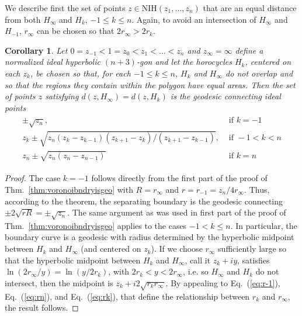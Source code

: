 \documentclass[10pt,a4paper]{article}
\newtheorem{corollary}{Corollary}
\begin{document}
 We describe first the set of points $z \in \text{NIH}(z_1, \ldots, z_n)$ that are an equal distance from both $H_{\infty}$ and $H_{k}$, $-1 \leq k \leq n$. Again, to avoid an intersection of $H_{\infty}$ and $H_{-1}$, $r_{\infty}$ can be chosen so that $2 r_{\infty} > 2 r_{k}$.  

 \begin{corollary}
 Let $0 = z_{-1} < 1 = z_0 < z_1 < \ldots < z_n$ and $z_{\infty} = \infty$ define a normalized ideal hyperbolic $(n+3)$-gon and let the horocycles $H_k$, centered on each $z_k$, be chosen so that, for each $-1 \leq k \leq n$, $H_k$ and $H_{\infty}$ do not overlap and so that the regions they contain within the polygon have equal areas. Then the set of points $z$ satisfying $d(z, H_{\infty}) = d(z, H_{k})$ is the geodesic connecting ideal points
 \begin{align*}
     \begin{aligned}
         \pm \sqrt{z_n}, & \text{ if } k=-1 \\
         z_{k} \pm \sqrt{ z_n (z_k - z_{k-1})(z_{k+1} - z_k) / (z_{k+1} - z_{k-1})}, & \text{ if } -1 < k < n  \\
         z_{n} \pm \sqrt{z_n(z_n-z_{n-1})} & \text{ if } k = n
     \end{aligned}
 \end{align*}
 \label{cor:voronoibndryisgeo1}
 \end{corollary}
 \begin{proof}
 The case $k = -1$ follows directly from the first part of the proof of Thm.\ \ref{thm:voronoibndryisgeo} with $R = r_{\infty}$ and $r = r_{-1} = z_n/4r_{\infty}$.  Thus, according to the theorem, the separating boundary is the geodesic connecting $\pm 2\sqrt{rR} = \pm \sqrt{z_n}$. The same argument as was used in first part of the proof of Thm.\ \ref{thm:voronoibndryisgeo} applies to the cases $-1 < k \leq n$. In particular, the boundary curve is a geodesic with radius determined by the hyperbolic midpoint between $H_k$ and $H_{\infty}$ (and centered on $z_k$). If we choose $r_{\infty}$ sufficiently large so that the hyperbolic midpoint between $H_{k}$ and $H_{\infty}$, call it $z_k + i y$, satisfies $\ln(2r_{\infty}/y) = \ln(y/2r_k)$, with $2r_k < y < 2r_{\infty}$, i.e. so $H_{\infty}$ and $H_{k}$ do not intersect, then the midpoint is $z_k + i2\sqrt{r_k r_{\infty}}$. By appealing to Eq.\ (\ref{eq:r-1}), Eq.\ (\ref{eq:rn}), and Eq.\ (\ref{eq:rk}), that define the relationship between $r_k$ and $r_{\infty}$, the result follows.
 \end{proof}
\end{document}
